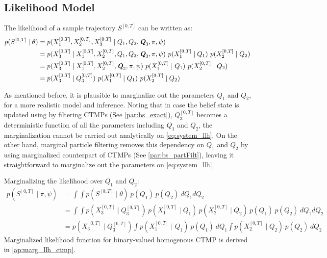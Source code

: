 \subsection{Likelihood Model}
 The likelihood of a sample trajectory $ S^{[0,T]} $ can be written as:
\begin{align}
p(S^{[0,T]} \mid \theta ) & = p(X_{1}^{[0, T]}, X_{2}^{[0, T]}, X_{3}^{[0, T]} \mid Q_{1}, Q_{2}, \textit{\textbf{Q}}_3, \pi, \psi) \nonumber\\
& = p(X_{3}^{[0, T]} \mid X_{1}^{[0, T]}, X_{2}^{[0, T]}, Q_{1}, Q_{2}, \textit{\textbf{Q}}_3, \pi, \psi) \ p(X_{1}^{[0, T]}\mid Q_{1}) \ p(X_{2}^{[0, T]}\mid Q_{2}) \nonumber\\ & = p(X_{3}^{[0, T]} \mid X_{1}^{[0, T]}, X_{2}^{[0, T]}, \textit{\textbf{Q}}_3, \pi, \psi) \ p(X_{1}^{[0, T]}\mid Q_{1}) \ p(X_{2}^{[0, T]}\mid Q_{2}) \nonumber\\ & = p(X_{3}^{[0, T]}\mid Q_{3}^{[0, T]}) \ p(X_{1}^{[0, T]}\mid Q_{1}) \ p(X_{2}^{[0, T]}\mid Q_{2}) 
\label{eq:system_llh}
\end{align}\par
As mentioned before, it is plausible to marginalize out the parameters $ Q_1 $ and $ Q_2 $, for a more realistic model and inference. Noting that in case the belief state is updated using by filtering CTMPs (See \cref{par:bs_exact}), $ Q_{3}^{[0, T]} $ becomes a deterministic function of all the parameters including $ Q_1 $ and $ Q_2 $, the marginalization cannot be carried out analytically on \autoref{eq:system_llh}. On the other hand, marginal particle filtering removes this dependency on $ Q_1 $ and $ Q_2 $ by using marginalized counterpart of CTMPs (See \cref{par:bs_partFilt}), leaving it straightforward to marginalize out the parameters on \autoref{eq:system_llh}.\par
Marginalizing the likelihood over $ Q_{1} $ and $ Q_{2} $:
\begin{align}
p(S^{[0,T]} \mid \pi, \psi ) & = 	\int \int p(S^{[0,T]} \mid \theta ) \ p(Q_{1}) \ p(Q_{2}) \ dQ_{1}dQ_{2} \nonumber\\ 
& = \int \int p(X_{3}^{[0, T]}\mid Q_{3}^{[0, T]}) \ p(X_{1}^{[0, T]}\mid Q_{1}) \ p(X_{2}^{[0, T]}\mid Q_{2}) \ p(Q_{1}) \ p(Q_{2})\ dQ_{1}dQ_{2} \nonumber\\ 
& = p(X_{3}^{[0, T]}\mid Q_{3}^{[0, T]}) \int  p(X_{1}^{[0, T]}\mid Q_{1}) \ p(Q_{1}) \ dQ_{1} \int p(X_{2}^{[0, T]}\mid Q_{2})\ p(Q_{2})\ dQ_{2}
\label{eq:Marg_llh}
\end{align}
Marginalized likelihood function for binary-valued homogenous CTMP is derived in \autoref{ap:marg_llh_ctmp}.\par
